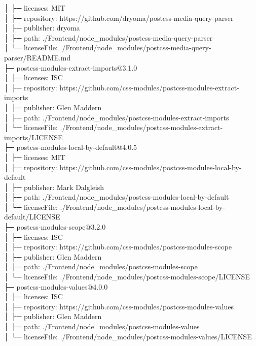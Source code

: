│  ├─ licenses: MIT\\
│  ├─ repository: https://github.com/dryoma/postcss-media-query-parser\\
│  ├─ publisher: dryoma\\
│  ├─ path: ./Frontend/node\_modules/postcss-media-query-parser\\
│  └─ licenseFile: ./Frontend/node\_modules/postcss-media-query-parser/README.md\\
├─ postcss-modules-extract-imports@3.1.0\\
│  ├─ licenses: ISC\\
│  ├─ repository: https://github.com/css-modules/postcss-modules-extract-imports\\
│  ├─ publisher: Glen Maddern\\
│  ├─ path: ./Frontend/node\_modules/postcss-modules-extract-imports\\
│  └─ licenseFile: ./Frontend/node\_modules/postcss-modules-extract-imports/LICENSE\\
├─ postcss-modules-local-by-default@4.0.5\\
│  ├─ licenses: MIT\\
│  ├─ repository: https://github.com/css-modules/postcss-modules-local-by-default\\
│  ├─ publisher: Mark Dalgleish\\
│  ├─ path: ./Frontend/node\_modules/postcss-modules-local-by-default\\
│  └─ licenseFile: ./Frontend/node\_modules/postcss-modules-local-by-default/LICENSE\\
├─ postcss-modules-scope@3.2.0\\
│  ├─ licenses: ISC\\
│  ├─ repository: https://github.com/css-modules/postcss-modules-scope\\
│  ├─ publisher: Glen Maddern\\
│  ├─ path: ./Frontend/node\_modules/postcss-modules-scope\\
│  └─ licenseFile: ./Frontend/node\_modules/postcss-modules-scope/LICENSE\\
├─ postcss-modules-values@4.0.0\\
│  ├─ licenses: ISC\\
│  ├─ repository: https://github.com/css-modules/postcss-modules-values\\
│  ├─ publisher: Glen Maddern\\
│  ├─ path: ./Frontend/node\_modules/postcss-modules-values\\
│  └─ licenseFile: ./Frontend/node\_modules/postcss-modules-values/LICENSE\\
